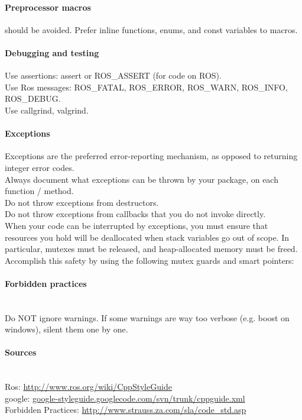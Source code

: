 \paragraph{Preprocessor macros} should be avoided. Prefer inline functions, enums, and const variables to macros.

\paragraph{Debugging and testing}
Use assertions: assert or ROS\_ASSERT (for code on ROS).\\
Use Ros messages: ROS\_FATAL, ROS\_ERROR, ROS\_WARN, ROS\_INFO, ROS\_DEBUG.\\
Use callgrind, valgrind.

\paragraph{Exceptions}

Exceptions are the preferred error-reporting mechanism, as opposed to returning integer error codes.\\
Always document what exceptions can be thrown by your package, on each function / method.\\
Do not throw exceptions from destructors.\\
Do not throw exceptions from callbacks that you do not invoke directly.\\


When your code can be interrupted by exceptions, you must ensure that resources you hold will be deallocated when stack variables go out of scope. In particular, mutexes must be released, and heap-allocated memory must be freed. Accomplish this safety by using the following mutex guards and smart pointers:

\paragraph{Forbidden practices}~\\
Do NOT ignore warnings. If some warnings are way too verbose (e.g. boost on windows), silent them one by one.



\paragraph{Sources}~\\
Ros: \url{http://www.ros.org/wiki/CppStyleGuide}\\
google: \url{google-styleguide.googlecode.com/svn/trunk/cppguide.xml}\\
Forbidden Practices: \url{http://www.strauss.za.com/sla/code_std.asp}\\




